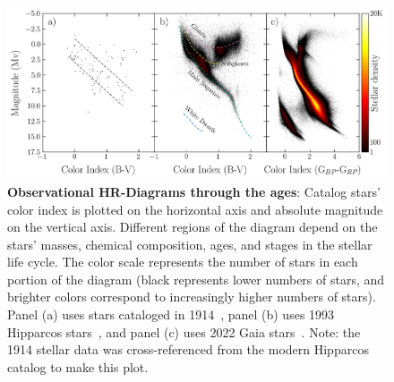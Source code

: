 \begin{figure}
\begin{center}
  \centerline{\includegraphics[width=1.2\linewidth]{figures/hr_diagram.png}}
  \caption{\textbf{Observational HR-Diagrams through the ages}: Catalog stars' color index is plotted on the horizontal axis and absolute magnitude on the vertical axis. Different regions of the diagram depend on the stars' masses, chemical composition, ages, and stages in the stellar life cycle. The color scale represents the number of stars in each portion of the diagram (black represents lower numbers of stars, and brighter colors correspond to increasingly higher numbers of stars). Panel (a) uses stars cataloged in 1914~\cite{Russell:1914:PA, 1914_HR_data}, panel (b) uses 1993 Hipparcos stars~\cite{HIPPARCOS}, and panel (c) uses 2022 Gaia stars~\cite{GaiaMission, GaiaEDR3}. Note: the 1914 stellar data was cross-referenced from the modern Hipparcos catalog to make this plot.
}
  \label{fig:HR-diagrams}
\end{center}
\end{figure}



